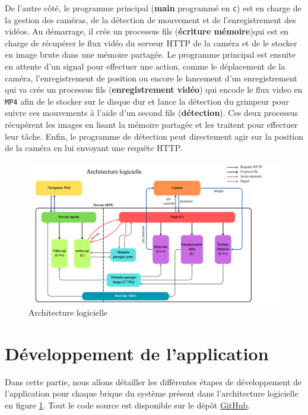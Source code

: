 \documentclass[a4paper, 11pt, french]{article}
\begin{document}
De l'autre côté, le programme principal (\textbf{main} programmé en \texttt{c}) est en charge de la gestion des caméras, de la détection de mouvement et de l'enregistrement des vidéos. Au démarrage, il crée un processus fils (\textbf{écriture mémoire})qui est en charge de récupérer le flux vidéo du serveur HTTP de la caméra et de le stocker en image brute dans une mémoire partagée. Le programme principal est ensuite en attente d'un signal pour effectuer une action, comme le déplacement de la caméra, l'enregistrement de position ou encore le lancement d'un enregistrement qui va crée un processus fils (\textbf{enregistrement vidéo}) qui encode le flux video en \texttt{MP4} afin de le stocker sur le disque dur et lance la détection du grimpeur pour suivre ces mouvements à l'aide d'un second fils (\textbf{détection}). Ces deux processus récupèrent les images en lisant la mémoire partagée et les traitent pour effectuer leur tâche. Enfin, le programme de détection peut directement agir sur la position de la caméra en lui envoyant une requête HTTP.


\begin{figure}[!ht]
  \centering
  \includegraphics[width=\textwidth]{architectureLogicielle.png}
  \caption{Architecture logicielle}
  \label{fig:architectureLogicielle}
\end{figure}



\section{Développement de l'application}
Dans cette partie, nous allons détailler les différentes étapes de développement de l'application pour chaque brique du système présent dans l'architecture logicielle en figure \ref{fig:architectureLogicielle}. Tout le code source est disponible sur le dépôt \href{https://github.com/Romaiiin91/suiviGrimpeur_PDI}{GitHub}.
\end{document}
